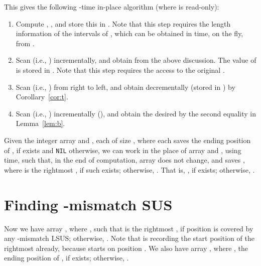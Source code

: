 \documentclass[11pt]{llncs}
\newcommand{\remove}[1]{}
\begin{document}
\bigskip

\noindent
This gives the following -time in-place algorithm (where  is read-only):
\begin{enumerate}
  \setlength{\itemsep}{0pt} \item Compute ,
  , and store this in .
  Note that this step requires the length information of the intervals
  of , which can be obtained in  time, on the fly, from
   .
\item Scan  (i.e., ) incrementally,
  and obtain  from
  the above discussion.  The value of  is stored in .  Note
  that this step requires the access to the original .
\item Scan  (i.e., ) from right to left, and obtain
   decrementally (stored in ) by
  Corollary~\ref{cor:t}. 
\item Scan  (i.e., )
  incrementally (), and obtain the
  desired  by the second equality in Lemma~\ref{lem:b}.
\end{enumerate}


\begin{lemma}
\label{lem:sls}

Given the integer array  and , each of size , 
where each  saves the ending
position of , if  exists and {\tt NIL}
otherwise, we can work in the place of
array  and , using  time, such that, 
in the end of computation,
array  does not change, and  saves , where
 is the rightmost , 
if such  exists; otherwise, .
That is, 
, if  exists;
otherwise, .
\end{lemma}




\section{Finding -mismatch SUS}
\label{sec:sus}
Now we have array , where , such that  is the
rightmost , if position  is covered by any
-mismatch LSUS; otherwise, . Note that 
is recording the start position of the rightmost  already,
because  starts on position .  We also have array ,
where , the ending position of , if
 exists; otherwise, .

\remove{
Recall that it is possible that some positions may not be covered by
any -mismatch LSUS (see the example after
Definition~\ref{def:lsus}). Due to Lemma~\ref{lem:exist}
and~\ref{lem:lsus2}, we know such positions must comprise a continuous
chunk on the right end of string . Let , , denote
the rightmost position that is covered by at least one -mismatch
LSUS, i.e.,  is the rightmost non-NIL element in array
. Again, due to Lemma~\ref{lem:exist} and~\ref{lem:lsus2}, it is
trivial to find the value of  in  time: scan
array  from right toward left, and stop when meeting the first
non-NIL  array element, say , then .
}
\end{document}

